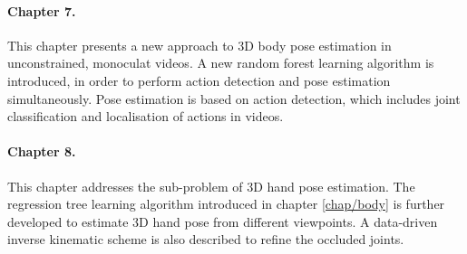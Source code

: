 \paragraph{Chapter 7.} 
This chapter presents a new approach to 3D body pose estimation in unconstrained, monoculat videos. 
A new random forest learning algorithm is introduced, in order to perform action detection and pose estimation simultaneously. 
Pose estimation is based on action detection, which includes joint classification and localisation of actions in videos. 

\paragraph{Chapter 8.} 
This chapter addresses the sub-problem of 3D hand pose estimation. 
The regression tree learning algorithm introduced in chapter \ref{chap/body} is further developed to estimate 3D hand pose from different viewpoints. 
A data-driven inverse kinematic scheme is also described to refine the occluded joints.

